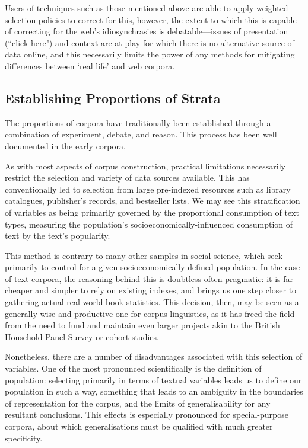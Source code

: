 Users of techniques such as those mentioned above are able to apply weighted selection policies to correct for this, however, the extent to which this is capable of correcting for the web's idiosynchrasies is debatable---issues of presentation (``click here") and context are at play for which there is no alternative source of data online, and this necessarily limits the power of any methods for mitigating differences between `real life' and web corpora. %


\subsection{Establishing Proportions of Strata}
The proportions of corpora have traditionally been established through a combination of experiment, debate, and reason.  This process has been well documented in the early corpora, 


As with most aspects of corpus construction, practical limitations necessarily restrict the selection and variety of data sources available.  This has conventionally led to selection from large pre-indexed resources such as library catalogues, publisher's records, and bestseller lists.  We may see this stratification of variables as being primarily governed by the proportional consumption of text types, measuring the population's socioeconomically-influenced consumption of text by the text's popularity.

This method is contrary to many other samples in social science, which seek primarily to control for a given socioeconomically-defined population.  In the case of text corpora, the reasoning behind this is doubtless often pragmatic: it is far cheaper and simpler to rely on existing indexes, and brings us one step closer to gathering actual real-world book statistics.  This decision, then, may be seen as a generally wise and productive one for corpus linguistics, as it has freed the field from the need to fund and maintain even larger projects akin to the British Household Panel Survey or cohort studies.

Nonetheless, there are a number of disadvantages associated with this selection of variables.  One of the most pronounced scientifically is the definition of population: selecting primarily in terms of textual variables leads us to define our population in such a way, something that leads to an ambiguity in the boundaries of representation for the corpus, and the limits of generalisability for any resultant conclusions.  This effects is especially pronounced for special-purpose corpora, about which generalisations must be qualified with much greater specificity.

